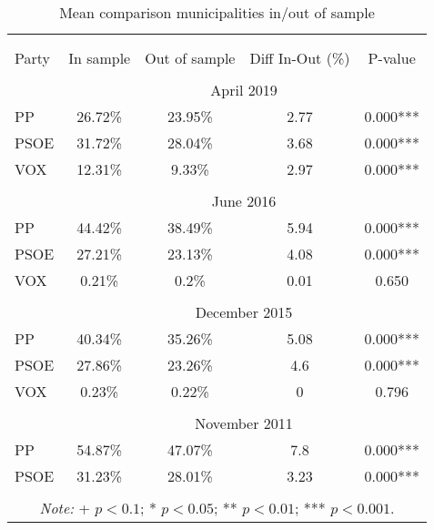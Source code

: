 \begin{table}[!htbp] \centering
\caption{Mean comparison municipalities in/out of sample}
\label{tab:ttest_sample}
\small
\begin{tabular}{lcccc}
\\[-1.8ex]\hline
\hline \\[-1.8ex]
\\[-1.8ex]
Party & In sample & Out of sample & Diff In-Out (\%) & P-value \\
\hline \\[-1.8ex]
& \multicolumn{4}{c}{April 2019}\\
PP & 26.72\% & 23.95\% & 2.77 & 0.000*** \\
PSOE & 31.72\% & 28.04\% & 3.68 & 0.000*** \\
VOX & 12.31\% & 9.33\% & 2.97 & 0.000*** \\
\hline \\[-1.8ex]
& \multicolumn{4}{c}{June 2016}\\
PP & 44.42\% & 38.49\% & 5.94 & 0.000*** \\
PSOE & 27.21\% & 23.13\% & 4.08 & 0.000*** \\
VOX & 0.21\% & 0.2\% & 0.01 & 0.650 \\
\hline \\[-1.8ex]
& \multicolumn{4}{c}{December 2015}\\
PP & 40.34\% & 35.26\% & 5.08 & 0.000*** \\
PSOE & 27.86\% & 23.26\% & 4.6 & 0.000*** \\
VOX & 0.23\% & 0.22\% & 0 & 0.796 \\
\hline \\[-1.8ex]
& \multicolumn{4}{c}{November 2011}\\
PP & 54.87\% & 47.07\% & 7.8 & 0.000*** \\
PSOE & 31.23\% & 28.01\% & 3.23 & 0.000*** \\
\hline
\hline \\[-1.8ex]
\multicolumn{5}{c}{\parbox[t]{0.65\textwidth}{\textit{Note:} + $p<0.1$; * $p<0.05$; ** $p<0.01$; *** $p<0.001$.}}\\
\end{tabular}
\end{table}
